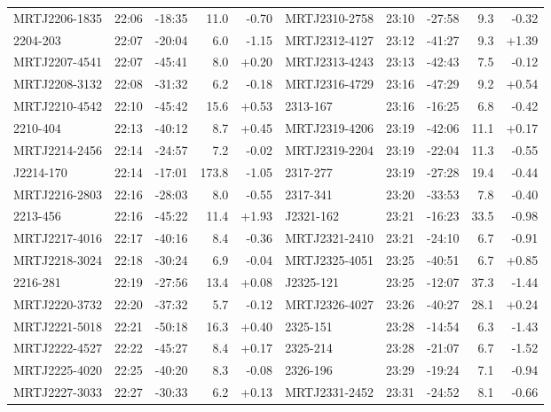 \documentclass[preprint]{aastex}
\begin{document}
\begin{table}[ht]
\begin{tabular}{l|lrrr||l|lrrr}
MRTJ2206-1835 & 22:06 & -18:35 &   11.0 & -0.70 & MRTJ2310-2758 & 23:10 & -27:58 &    9.3 & -0.32 \\
  2204-203 & 22:07 & -20:04 &    6.0 & -1.15 & MRTJ2312-4127 & 23:12 & -41:27 &    9.3 & +1.39 \\
MRTJ2207-4541 & 22:07 & -45:41 &    8.0 & +0.20 & MRTJ2313-4243 & 23:13 & -42:43 &    7.5 & -0.12 \\
MRTJ2208-3132 & 22:08 & -31:32 &    6.2 & -0.18 & MRTJ2316-4729 & 23:16 & -47:29 &    9.2 & +0.54 \\
MRTJ2210-4542 & 22:10 & -45:42 &   15.6 & +0.53 &   2313-167 & 23:16 & -16:25 &    6.8 & -0.42 \\
  2210-404 & 22:13 & -40:12 &    8.7 & +0.45 & MRTJ2319-4206 & 23:19 & -42:06 &   11.1 & +0.17 \\
MRTJ2214-2456 & 22:14 & -24:57 &    7.2 & -0.02 & MRTJ2319-2204 & 23:19 & -22:04 &   11.3 & -0.55 \\
 J2214-170 & 22:14 & -17:01 &  173.8 & -1.05 &   2317-277 & 23:19 & -27:28 &   19.4 & -0.44 \\
MRTJ2216-2803 & 22:16 & -28:03 &    8.0 & -0.55 &   2317-341 & 23:20 & -33:53 &    7.8 & -0.40 \\
  2213-456 & 22:16 & -45:22 &   11.4 & +1.93 &  J2321-162 & 23:21 & -16:23 &   33.5 & -0.98 \\
MRTJ2217-4016 & 22:17 & -40:16 &    8.4 & -0.36 & MRTJ2321-2410 & 23:21 & -24:10 &    6.7 & -0.91 \\
MRTJ2218-3024 & 22:18 & -30:24 &    6.9 & -0.04 & MRTJ2325-4051 & 23:25 & -40:51 &    6.7 & +0.85 \\
  2216-281 & 22:19 & -27:56 &   13.4 & +0.08 &  J2325-121 & 23:25 & -12:07 &   37.3 & -1.44 \\
MRTJ2220-3732 & 22:20 & -37:32 &    5.7 & -0.12 & MRTJ2326-4027 & 23:26 & -40:27 &   28.1 & +0.24 \\
MRTJ2221-5018 & 22:21 & -50:18 &   16.3 & +0.40 &   2325-151 & 23:28 & -14:54 &    6.3 & -1.43 \\
MRTJ2222-4527 & 22:22 & -45:27 &    8.4 & +0.17 &   2325-214 & 23:28 & -21:07 &    6.7 & -1.52 \\
MRTJ2225-4020 & 22:25 & -40:20 &    8.3 & -0.08 &   2326-196 & 23:29 & -19:24 &    7.1 & -0.94 \\
MRTJ2227-3033 & 22:27 & -30:33 &    6.2 & +0.13 & MRTJ2331-2452 & 23:31 & -24:52 &    8.1 & -0.66 \\
\hline
\end{tabular}
\end{table}
\end{document}
